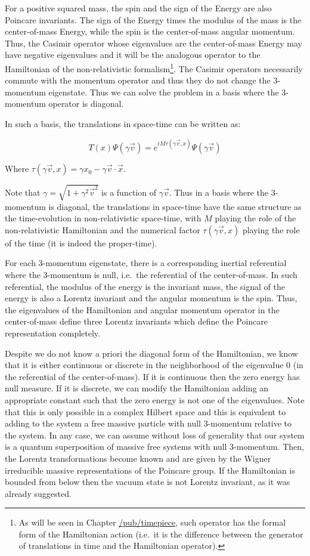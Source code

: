 \documentclass[11pt]{book}
\begin{document}
For a positive squared mass, the spin and the sign of the Energy are
also Poincare invariants. The sign of the Energy times the modulus of
the mass is the center-of-mass Energy, while the spin is the
center-of-mass angular momentum. Thus, the Casimir operator whose
eigenvalues are the center-of-mass Energy may have negative eigenvalues
and it will be the analogous operator to the Hamiltonian of the
non-relativistic formalism\footnote{As will be seen in Chapter
  \url{/pub/timepiece}, such operator has the formal form of the
  Hamiltonian action (i.e.~it is the difference between the generator of
  translations in time and the Hamiltonian operator).}. The Casimir
operators necessarily commute with the momentum operator and thus they
do not change the 3-momentum eigenstate. Thus we can solve the problem
in a basis where the 3-momentum operator is diagonal.

In such a basis, the translations in space-time can be written as:

\begin{equation}T(x)\Psi(\gamma\vec{v})=e^{i M \tau(\gamma\vec{v}, x)}\Psi(\gamma\vec{v})\end{equation}

Where \(\tau(\gamma\vec{v}, x)=\gamma x_0-\gamma \vec{v}\cdot \vec{x}\).

Note that \(\gamma=\sqrt{1+\gamma^2\vec{v}^2}\) is a function of
\(\gamma\vec{v}\). Thus in a basis where the 3-momentum is diagonal, the
translations in space-time have the same structure as the time-evolution
in non-relativistic space-time, with \(M\) playing the role of the
non-relativistic Hamiltonian and the numerical factor
\(\tau(\gamma\vec{v}, x)\) playing the role of the time (it is indeed
the proper-time).

For each 3-momentum eigenstate, there is a corresponding inertial
referential where the 3-momentum is null, i.e.~the referential of the
center-of-mass. In such referential, the modulus of the energy is the
invariant mass, the signal of the energy is also a Lorentz invariant and
the angular momentum is the spin. Thus, the eigenvalues of the
Hamiltonian and angular momentum operator in the center-of-mass define
three Lorentz invariants which define the Poincare representation
completely.

Despite we do not know a priori the diagonal form of the Hamiltonian, we
know that it is either continuous or discrete in the neighborhood of the
eigenvalue 0 (in the referential of the center-of-mass). If it is
continuous then the zero energy has null measure. If it is discrete, we
can modify the Hamiltonian adding an appropriate constant such that the
zero energy is not one of the eigenvalues. Note that this is only
possible in a complex Hilbert space and this is equivalent to adding to
the system a free massive particle with null 3-momentum relative to the
system. In any case, we can assume without loss of generality that our
system is a quantum superposition of massive free systems with null
3-momentum. Then, the Lorentz transformations become known and are given
by the Wigner irreducible massive representations of the Poincare
group\cite{Wigner1939On}. If the
Hamiltonian is bounded from below then the vacuum state is not Lorentz
invariant, as it was already
suggested\cite{Segal1991Is}.
\end{document}
